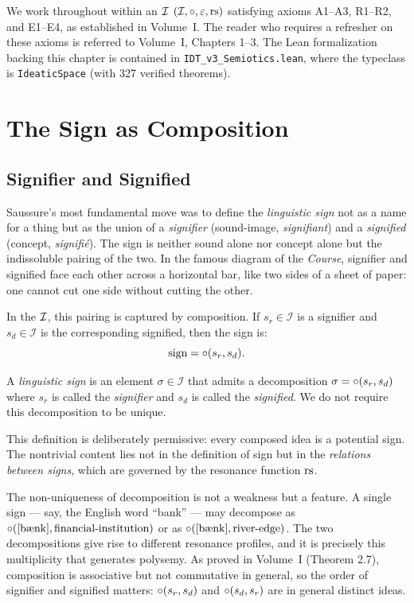 We work throughout within an $\mathcal{I}$ $(\mathcal{I}, \circ, \varepsilon, \mathrm{rs})$
satisfying axioms A1--A3, R1--R2, and E1--E4, as established in Volume~I.
The reader who requires a refresher on these axioms is referred to
Volume~I, Chapters 1--3. The Lean formalization backing this chapter
is contained in \texttt{IDT\_v3\_Semiotics.lean}, where the typeclass
is \texttt{IdeaticSpace} (with 327 verified theorems).

\section{The Sign as Composition}

\subsection{Signifier and Signified}

Saussure's most fundamental move was to define the \emph{linguistic sign}
not as a name for a thing but as the union of a \emph{signifier}
(sound-image, \textit{signifiant}) and a \emph{signified} (concept,
\textit{signifi\'e}). The sign is neither sound alone nor concept alone
but the indissoluble pairing of the two. In the famous diagram of the
\textit{Course}, signifier and signified face each other across a
horizontal bar, like two sides of a sheet of paper: one cannot cut one
side without cutting the other.

In the $\mathcal{I}$, this pairing is captured by composition. If $s_r \in
\mathcal{I}$ is a signifier and $s_d \in \mathcal{I}$ is the
corresponding signified, then the sign is:
\[
  \text{sign} = \circ(s_r, s_d).
\]

\begin{definition}
\label{def:linguistic-sign}
A \emph{linguistic sign} is an element $\sigma \in \mathcal{I}$ that
admits a decomposition $\sigma = \circ(s_r, s_d)$ where $s_r$ is
called the \emph{signifier} and $s_d$ is called the \emph{signified}.
We do not require this decomposition to be unique.
\end{definition}

This definition is deliberately permissive: every composed idea is a
potential sign. The nontrivial content lies not in the definition of
sign but in the \emph{relations between signs}, which are governed by
the resonance function $\mathrm{rs}$.

\begin{remark}
The non-uniqueness of decomposition is not a weakness but a feature.
A single sign --- say, the English word ``bank'' --- may decompose as
$\compose(\text{[b\ae{}nk]}, \text{financial-institution})$ or as
$\compose(\text{[b\ae{}nk]}, \text{river-edge})$. The two
decompositions give rise to different resonance profiles, and it is
precisely this multiplicity that generates polysemy. As proved in
Volume~I (Theorem 2.7), composition is associative but not
commutative in general, so the order of signifier and signified
matters: $\circ(s_r, s_d)$ and $\circ(s_d, s_r)$ are in general
distinct ideas.
\end{remark}

